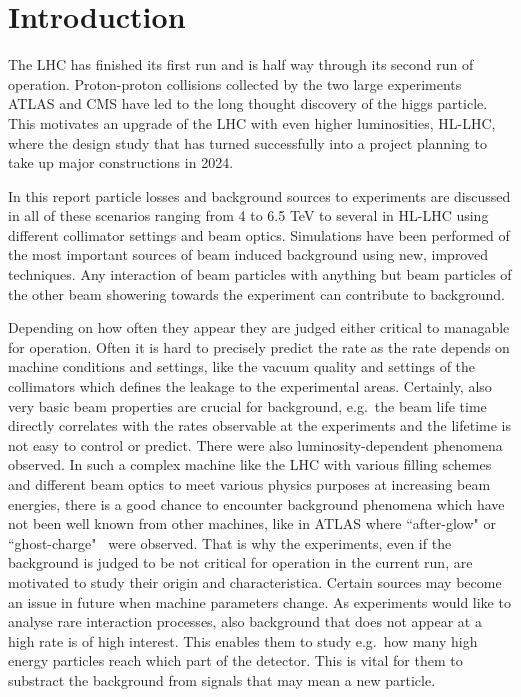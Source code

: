 \section{Introduction}


The LHC has finished its first run and is half way through its second run of operation. Proton-proton collisions collected by the two large experiments ATLAS and CMS have led to the long thought discovery of the higgs particle. This motivates an upgrade of the LHC with even higher luminosities, HL-LHC, where the design study that has turned successfully into a project planning to take up major constructions in 2024.

In this report particle losses and background sources to experiments are discussed in all of these scenarios ranging from 4 to 6.5 TeV to several in HL-LHC using different collimator settings and beam optics. Simulations have been performed of the most important sources of beam induced background using new, improved techniques. Any interaction of beam particles with anything but beam particles of the other beam showering towards the experiment can contribute to background.

Depending on how often they appear they are judged either critical to managable for operation. Often it is hard to precisely predict the rate as the rate depends on machine conditions and settings, like the vacuum quality and settings of the collimators which defines the leakage to the experimental areas. Certainly, also very basic beam properties are crucial for background, e.g.~the beam life time directly correlates with the rates observable at the experiments and the lifetime is not easy to control or predict. There were also luminosity-dependent phenomena observed. In such a complex machine like the LHC with various filling schemes and different beam optics to meet various physics purposes at increasing beam energies, there is a good chance to encounter background phenomena which have not been well known from other machines, like in ATLAS where ``after-glow" or ``ghost-charge"~\cite{ATLAS_JINST_13} were observed. That is why the experiments, even if the background is judged to be not critical for operation in the current run, are motivated to study their origin and characteristica. Certain sources may become an issue in future when machine parameters change. As experiments would like to analyse rare interaction processes, also background that does not appear at a high rate is of high interest. This enables them to study e.g.~how many high energy particles reach which part of the detector. This is vital for them to substract the background from signals that may mean a new particle. 

